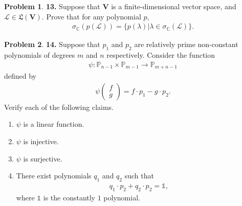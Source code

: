 \documentclass{book}
\theoremstyle{definition}
\newtheorem*{prob*}{Problem}
\newcommand{\V}{\mathbf{V}}
\newcommand{\lag}{\mathcal{L}}
\newcommand{\poly}{\mathbb{P}}
\newcommand{\LL}{\mathfrak{L}}
\begin{document}
\newpage



\begin{prob*}\textbf{13.} Suppose that $\V$ is a finite-dimensional vector space, and $\lag \in \LL(\V)$. Prove that for any polynomial $p$,
	\begin{align*}
	\sigma_\mathbb{C}(p(\lag)) = \{ p(\lambda) \vert \lambda \in \sigma_\mathbb{C}(\lag) \}.
	\end{align*}
	
\end{prob*}




























\newpage



\begin{prob*}\textbf{14.} Suppose that $p_1$ and $p_2$ are relatively prime non-constant polynomials of degrees $m$ and $n$ respectively. Consider the function 
	\begin{align*}
	\psi : \poly_{n-1} \times \poly_{m-1} \to \poly_{m+n-1}
	\end{align*}
	defined by
	\begin{align*}
	\psi\begin{pmatrix}
	f\\g
	\end{pmatrix} = f\cdot p_1 - g\cdot p_2.
	\end{align*}
	Verify each of the following claims.
	\begin{enumerate}
		\item $\psi$ is a linear function.
		\item $\psi$ is injective.
		\item $\psi$ is surjective.
		\item There exist polynomials $q_1$ and $q_2$ such that
		\begin{align*}
		q_1 \cdot p_2 + q_2 \cdot p_2 = \mathbb{1},
		\end{align*}
		where $\mathbb{1}$ is the constantly $1$ polynomial.
	\end{enumerate}
	
\end{prob*}
\end{document}
